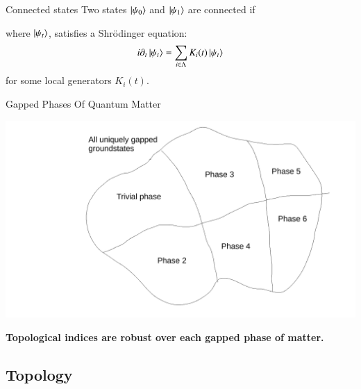 \documentclass{beamer}
\begin{document}
\begin{frame}{Connected states}
	Two states $\ket{\psi_0}$ and $\ket{\psi_1}$ are connected if
	\begin{center}
	\end{center}
	where $\ket{\psi_t}$, satisfies a Shr\"odinger equation:
	\[i\partial_t\ket{\psi_t}=\sum_{i\in\Lambda} K_{i}(t) \ket{\psi_t}\]
	for some local generators $K_i(t)$.
\end{frame}

\begin{frame}{Gapped Phases Of Quantum Matter}
	\begin{center}
		\includegraphics[width=\textwidth]{Images/GappedPhasesOfQuantumMatter.pdf}
	\end{center}
	\pause
	\textbf{Topological indices are robust over each gapped phase of matter.}
\end{frame}

\subsection{Topology}
\end{document}
